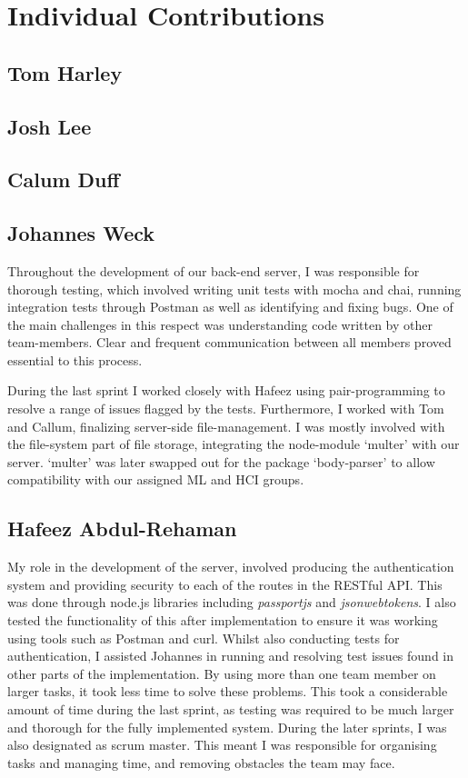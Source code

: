 \section{Individual Contributions}
\subsection{Tom Harley}
\subsection{Josh Lee}
\subsection{Calum Duff}
\subsection{Johannes Weck}
Throughout the development of our back-end server, I was responsible for thorough testing, which involved writing unit tests with mocha and chai, running integration tests through Postman as well as identifying and fixing bugs. One of the main challenges in this respect was understanding code written by other team-members. Clear and frequent communication between all members proved essential to this process.

During the last sprint I worked closely with Hafeez using pair-programming to resolve a range of issues flagged by the tests. Furthermore, I worked with Tom and Callum, finalizing server-side file-management. I was mostly involved with the file-system part of file storage, integrating the node-module `multer' with our server. `multer' was later swapped out for the package `body-parser' to allow compatibility with our assigned ML and HCI groups.
\subsection{Hafeez Abdul-Rehaman}
My role in the development of the server, involved producing the authentication system and providing security to each of the routes in the RESTful API. This was done through node.js libraries including \textit{passportjs} and \textit{jsonwebtokens}. I also tested the functionality of this after implementation to ensure it was working using tools such as Postman and curl. Whilst also conducting tests for authentication, I assisted Johannes in running and resolving test issues found in other parts of the implementation. By using more than one team member on larger tasks, it took less time to solve these problems. This took a considerable amount of time during the last sprint, as testing was required to be much larger and thorough for the fully implemented system. During the later sprints, I was also designated as scrum master. This meant I was responsible for organising tasks and managing time, and removing obstacles the team may face. 

